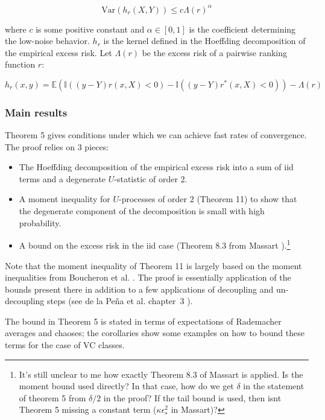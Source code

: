 \documentclass[a4paper,10pt]{article}
\begin{document}
\[\text{Var}(h_r(X, Y)) \leq c \Lambda(r)^\alpha\]

where $c$ is some positive constant and $\alpha \in [0, 1]$ is the coefficient determining the low-noise behavior. $h_r$ is the kernel defined in the Hoeffding decomposition of the empirical excess risk. Let $\Lambda(r)$ be the excess risk of a pairwise ranking function $r$:

\begin{equation}
  \label{eq:kernel}
  h_r(x,y) = \mathbb{E}(\mathbb{I}((y-Y)r(x, X) < 0) - \mathbb{I}((y-Y)r^*(x, X) < 0)) - \Lambda(r)
\end{equation}

\subsubsection{Main results}

Theorem 5 gives conditions under which we can achieve fast rates of convergence. The proof relies on 3 pieces:

\begin{itemize}
  \item The Hoeffding decomposition of the empirical excess risk into a sum of iid terms and a degenerate $U$-statistic of order $2$.
  \item A moment inequality for $U$-processes of order $2$ (Theorem 11) to show that the degenerate component of the decomposition is small with high probability.
  \item A bound on the excess risk in the iid case (Theorem 8.3 from Massart \cite{massart-2007-model-selection}).\footnote{It's still unclear to me how exactly Theorem 8.3 of Massart is applied. Is the moment bound used directly? In that case, how do we get $\delta$ in the statement of theorem 5 from $\delta/2$ in the proof? If the tail bound is used, then isnt Theorem 5 missing a constant term ($\kappa \epsilon^2_*$ in Massart)?}
\end{itemize}

Note that the moment inequality of Theorem 11 is largely based on the moment inequalities from Boucheron et al. \cite{boucheron-2005-moment-inequalities}. The proof is essentially application of the bounds present there in addition to a few applications of decoupling and un-decoupling steps (see de la Pe\~{n}a et al. chapter~3 \cite{de-la-pena-1999-decoupling}).

The bound in Theorem 5 is stated in terms of expectations of Rademacher averages and chaoses; the corollaries show some examples on how to bound these terms for the case of VC classes.
\end{document}
